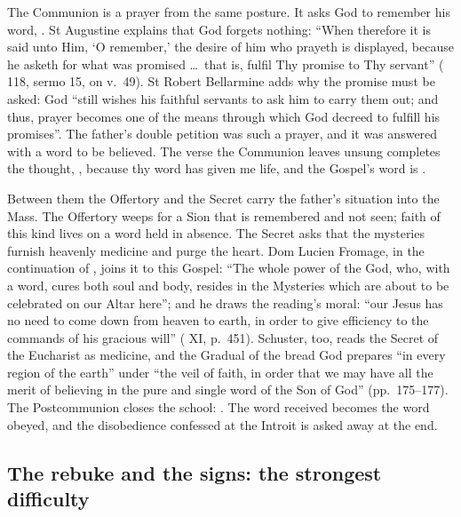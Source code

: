The Communion is a prayer from the same posture. It asks God to remember his
word, . St Augustine explains that God forgets
nothing: ``When therefore it is said unto Him, `O remember,' the desire of him
who prayeth is displayed, because he asketh for what was promised \dots\ that
is, fulfil Thy promise to Thy servant'' ( 118, sermo 15, on v.~49). St Robert Bellarmine adds why the promise must be asked: God ``still
wishes his faithful servants to ask him to carry them out; and thus, prayer
becomes one of the means through which God decreed to fulfill his promises''.
The father's double petition was such a prayer, and it was answered with a
word to be believed. The verse the Communion leaves unsung completes the
thought, , because thy word has given me
life, and the Gospel's word is .

Between them the Offertory and the Secret carry the father's situation into the
Mass. The Offertory weeps for a Sion that is remembered and not seen; faith of
this kind lives on a word held in absence. The Secret asks that the mysteries
furnish heavenly medicine and purge the heart. Dom Lucien Fromage, in the
continuation of , joins it to this Gospel: ``The whole
power of the God, who, with a word, cures both soul and body, resides in the
Mysteries which are about to be celebrated on our Altar here''; and he draws the
reading's moral: ``our Jesus has no need to come down from heaven to earth, in
order to give efficiency to the commands of his gracious will'' ( XI, p.~451). Schuster, too, reads the Secret of the
Eucharist as medicine, and the Gradual of the bread God prepares ``in every
region of the earth'' under ``the veil of faith, in order that we may have all
the merit of believing in the pure and single word of the Son of God''
(pp.~175--177). The Postcommunion closes the school: . The word received becomes the word obeyed, and the
disobedience confessed at the Introit is asked away at the end.

\subsection{The rebuke and the signs: the strongest difficulty}

